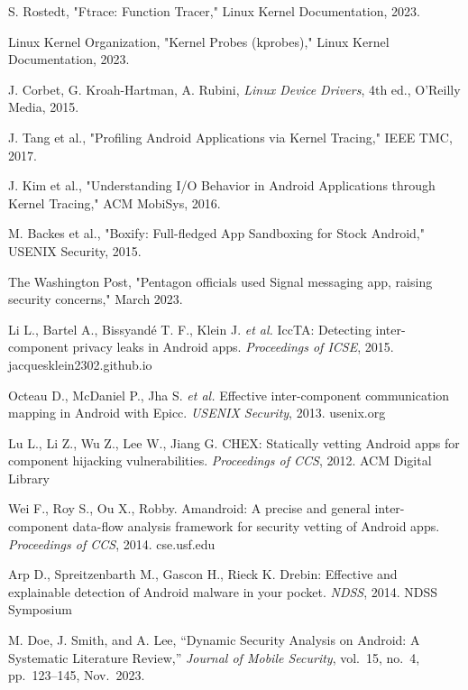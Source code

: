 \documentclass[a4paper,12pt]{report}
\begin{document}
\begin{thebibliography}{99}
     S. Rostedt, "Ftrace: Function Tracer," Linux Kernel Documentation, 2023.

     Linux Kernel Organization, "Kernel Probes (kprobes)," Linux Kernel Documentation, 2023.

     J. Corbet, G. Kroah-Hartman, A. Rubini, \textit{Linux Device Drivers}, 4th ed., O'Reilly Media, 2015.

     J. Tang et al., "Profiling Android Applications via Kernel Tracing," IEEE TMC, 2017.

     J. Kim et al., "Understanding I/O Behavior in Android Applications through Kernel Tracing," ACM MobiSys, 2016.

     M. Backes et al., "Boxify: Full-fledged App Sandboxing for Stock Android," USENIX Security, 2015.

     The Washington Post, "Pentagon officials used Signal messaging app, raising security concerns," March 2023.

    Li L., Bartel A., Bissyandé T. F., Klein J. \emph{et al.} IccTA: Detecting inter-component privacy leaks in Android apps. \textit{Proceedings of ICSE}, 2015. jacquesklein2302.github.io

    Octeau D., McDaniel P., Jha S. \emph{et al.} Effective inter-component communication mapping in Android with Epicc. \textit{USENIX Security}, 2013. usenix.org

    Lu L., Li Z., Wu Z., Lee W., Jiang G. CHEX: Statically vetting Android apps for component hijacking vulnerabilities. \textit{Proceedings of CCS}, 2012. ACM Digital Library

    Wei F., Roy S., Ou X., Robby. Amandroid: A precise and general inter-component data-flow analysis framework for security vetting of Android apps. \textit{Proceedings of CCS}, 2014. cse.usf.edu

    Arp D., Spreitzenbarth M., Gascon H., Rieck K. Drebin: Effective and explainable detection of Android malware in your pocket. \textit{NDSS}, 2014. NDSS Symposium

    M. Doe, J. Smith, and A. Lee,
    ``Dynamic Security Analysis on Android: A Systematic Literature Review,''
    \emph{Journal of Mobile Security}, vol.~15, no.~4, pp.~123–145, Nov.~2023.


\end{thebibliography}
\end{document}
